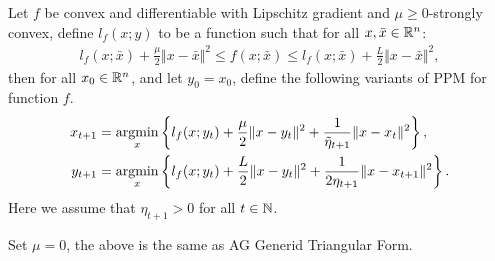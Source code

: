 \documentclass[12pt]{article}
\begin{document}
        \begin{definition}\label{def:agg_ppm_scvx}
            Let $f$ be convex and differentiable with Lipschitz gradient and $\mu\ge0$-strongly convex, define $l_f(x; y)$ to be a function such that for all $x, \bar x \in \mathbb R^n$: 
            \begin{align*}
               l_f(x; \bar x) + \frac{\mu}{2}\Vert x - \bar x\Vert^2
               \le f(x; \bar x) 
               \le l_f(x; \bar x) + \frac{L}{2}\Vert x - \bar x\Vert^2, 
            \end{align*}
            then for all $x_0 \in \mathbb R^n$, and let $y_0 = x_0$, define the following variants of PPM for function $f$. 
            \begin{align*}
                x_{t + 1} &= \mathop{\rm argmin}\limits_{x} \left\lbrace
                l_f(x; y_t) + \frac{\mu}{2}\Vert x - y_t\Vert^2 + \frac{1}{\tilde \eta_{t + 1}} \Vert x - x_t\Vert^2
                \right\rbrace, 
                \\
                y_{t + 1} &= \mathop{\rm argmin}\limits_{x} 
                \left\lbrace
                    l_f(x; y_t) + \frac{L}{2}\Vert x - y_t\Vert^2 + 
                    \frac{1}{2\eta_{t + 1}}\Vert x - x_{t + 1}\Vert^2
                \right\rbrace. 
            \end{align*}
            Here we assume that $\eta_{t + 1} > 0$ for all $t \in \mathbb N$. 
        \end{definition}
        \begin{remark}
            Set $\mu = 0$, the above is the same as AG Generid Triangular Form. 
        \end{remark}
\end{document}
